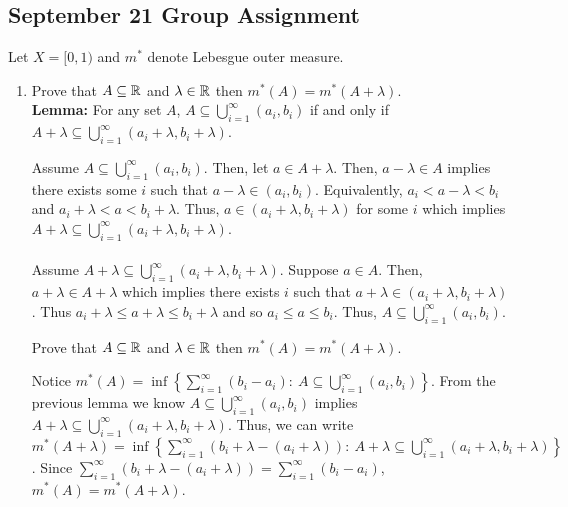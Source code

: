 \subsection{September 21 Group Assignment} Let $X=[0,1)$ and $m^{*}$ denote Lebesgue outer measure.
\begin{enumerate}
\item Prove that $A\subseteq {\mathbb R}$ and $\lambda \in {\mathbb R}$ then $m^{*}(A)=m^{*}(A+\lambda)$. \\
\textbf{Lemma:} For any set $A$, $A \subseteq \bigcup_{i=1}^\infty (a_i, b_i)$ if and only if $A + \lambda \subseteq \bigcup_{i=1}^\infty (a_i + \lambda, b_i + \lambda)$. 
\begin{pf}
Assume $A \subseteq \bigcup_{i=1}^\infty (a_i, b_i)$. Then, let $a \in A + \lambda$. Then, $a - \lambda \in A$ implies there exists some $i$ such that $a - \lambda \in (a_i, b_i)$. Equivalently, $a_i < a - \lambda < b_i$ and $a_i + \lambda < a < b_i + \lambda$. Thus, $a \in (a_i + \lambda, b_i + \lambda)$ for some $i$ which implies $A + \lambda \subseteq \bigcup_{i=1}^\infty (a_i + \lambda, b_i + \lambda)$.\\
\\
Assume $A + \lambda \subseteq \bigcup_{i=1}^\infty (a_i + \lambda, b_i + \lambda)$. Suppose $a \in A$. Then, $a+\lambda \in A + \lambda$ which implies there exists $i$ such that $a + \lambda \in (a_i + \lambda, b_i + \lambda)$. Thus $a_i+\lambda \leq a + \lambda \leq b_i + \lambda$ and so $a_i \leq a \leq b_i$. Thus, $A \subseteq \bigcup_{i=1}^\infty (a_i, b_i)$. 
\end{pf}
Prove that $A\subseteq {\mathbb R}$ and $\lambda \in {\mathbb R}$ then $m^{*}(A)=m^{*}(A+\lambda)$.
\begin{pf}
	Notice $m^{*}(A)= \inf\left\lbrace \sum_{i=1}^\infty (b_i - a_i) \colon \ A \subseteq \bigcup_{i=1}^\infty (a_i, b_i) \right\rbrace$. From the previous lemma we know $A \subseteq \bigcup_{i=1}^\infty (a_i, b_i) $ implies $A + \lambda \subseteq \bigcup_{i=1}^\infty (a_i + \lambda, b_i + \lambda) $. Thus, we can write $m^{*}(A+ \lambda)= \inf\left\lbrace \sum_{i=1}^\infty (b_i +\lambda - (a_i + \lambda)) \colon \ A + \lambda \subseteq \bigcup_{i=1}^\infty (a_i + \lambda, b_i + \lambda) \right\rbrace$. Since $\sum_{i=1}^\infty (b_i +\lambda - (a_i + \lambda)) = \sum_{i=1}^\infty (b_i - a_i)$, $m^{*}(A)=m^{*}(A+\lambda)$.
\end{pf}



\end{enumerate}
